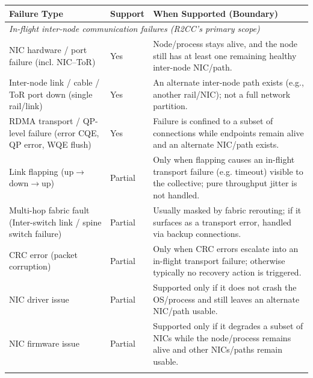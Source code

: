 \begin{table}[!t]
\centering
\begin{tabular}{p{}p{}p{}}
\toprule
\textbf{Failure Type} & \textbf{Support} & \textbf{When Supported (Boundary)} \\
\midrule

\multicolumn{3}{l}{\textit{In-flight inter-node communication failures (R2CC’s primary scope)}} \\
\midrule
NIC hardware / port failure (incl. NIC--ToR) & Yes &
Node/process stays alive, and the node still has at least one remaining healthy inter-node NIC/path. \\
\addlinespace

Inter-node link / cable / ToR port down (single rail/link) & Yes &
An alternate inter-node path exists (e.g., another rail/NIC); not a full network partition. \\
\addlinespace

RDMA transport / QP-level failure (error CQE, QP error, WQE flush) & Yes &
Failure is confined to a subset of connections while endpoints remain alive and an alternate NIC/path exists. \\
\addlinespace

Link flapping (up$\rightarrow$down$\rightarrow$up) & Partial &
Only when flapping causes an in-flight transport failure (e.g. timeout) visible to the collective; pure throughput jitter is not handled. \\
\addlinespace

Multi-hop fabric fault (Inter-switch link / spine switch failure) & Partial &
Usually masked by fabric rerouting; if it surfaces as a transport error, handled via backup connections. \\
\addlinespace

CRC error (packet corruption) & Partial &
Only when CRC errors escalate into an in-flight transport failure; otherwise typically no recovery action is triggered. \\
\addlinespace

NIC driver issue & Partial &
Supported only if it does not crash the OS/process and still leaves an alternate NIC/path usable. \\
\addlinespace

NIC firmware issue & Partial &
Supported only if it degrades a subset of NICs while the node/process remains alive and other NICs/paths remain usable. \\
\addlinespace


\end{tabular}
\end{table}

